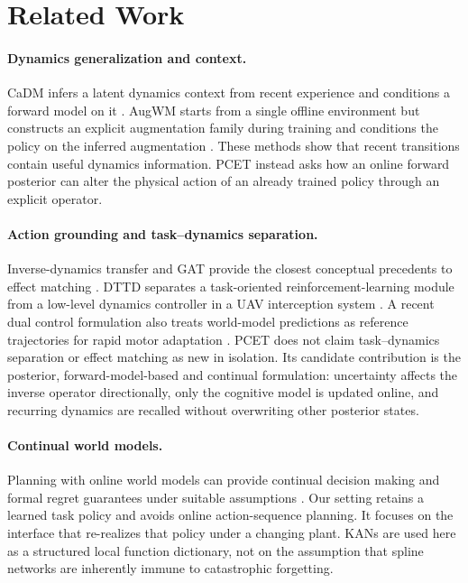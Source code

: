 \documentclass[letterpaper]{article}
\begin{document}
\section{Related Work}

\paragraph{Dynamics generalization and context.}
CaDM infers a latent dynamics context from recent experience and conditions a
forward model on it \cite{lee2020cadm}.  AugWM starts from a single offline
environment but constructs an explicit augmentation family during training and
conditions the policy on the inferred augmentation \cite{ball2021augwm}.
These methods show that recent transitions contain useful dynamics information.
PCET instead asks how an online forward posterior can alter the physical action
of an already trained policy through an explicit operator.

\paragraph{Action grounding and task--dynamics separation.}
Inverse-dynamics transfer and GAT provide the closest conceptual precedents to
effect matching \cite{christiano2016inverse,hanna2021gat}.  DTTD separates a
task-oriented reinforcement-learning module from a low-level dynamics
controller in a UAV interception system \cite{liu2023dttd}.  A recent dual
control formulation also treats world-model predictions as reference
trajectories for rapid motor adaptation \cite{brito2025rwm}.  PCET does not
claim task--dynamics separation or effect matching as new in isolation.  Its
candidate contribution is the posterior, forward-model-based and continual
formulation: uncertainty affects the inverse operator directionally, only the
cognitive model is updated online, and recurring dynamics are recalled without
overwriting other posterior states.

\paragraph{Continual world models.}
Planning with online world models can provide continual decision making and
formal regret guarantees under suitable assumptions \cite{liu2025onlinewm}.
Our setting retains a learned task policy and avoids online action-sequence
planning.  It focuses on the interface that re-realizes that policy under a
changing plant.  KANs \cite{liu2024kan} are used here as a structured local
function dictionary, not on the assumption that spline networks are inherently
immune to catastrophic forgetting.
\end{document}
